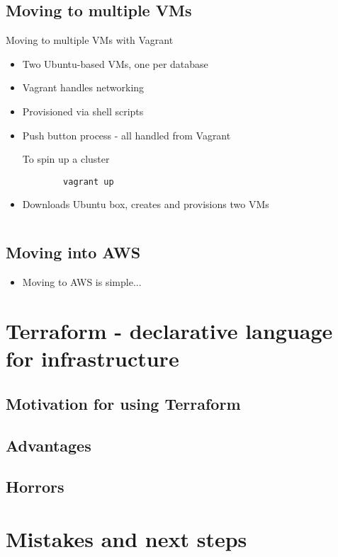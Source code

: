 \documentclass[xcolor=dvipsnames]{beamer}
\begin{document}
\subsection{Moving to multiple VMs}
\begin{frame}[fragile]{Moving to multiple VMs with Vagrant}
  \begin{itemize}
    \item Two Ubuntu-based VMs, one per database
    \item Vagrant handles networking
    \item Provisioned via shell scripts
    \item Push button process - all handled from Vagrant
    \pause
    \begin{block}{To spin up a cluster}
      \begin{verbatim}
        vagrant up\end{verbatim}
    \end{block}
    \item Downloads Ubuntu box, creates and provisions two VMs
  \end{itemize}
\end{frame}

\begin{frame}
  \begin{lstlisting}

  \end{lstlisting}
\end{frame}

\subsection[Cloudy time]{Moving into AWS}
\begin{frame}
  \begin{itemize}
    \item Moving to AWS is simple...
  \end{itemize}
\end{frame}



\section[Terraform]{Terraform - declarative language for infrastructure}

\subsection[Motivation]{Motivation for using Terraform}

\subsection{Advantages}

\subsection{Horrors}



\section[Next steps]{Mistakes and next steps}
\end{document}
